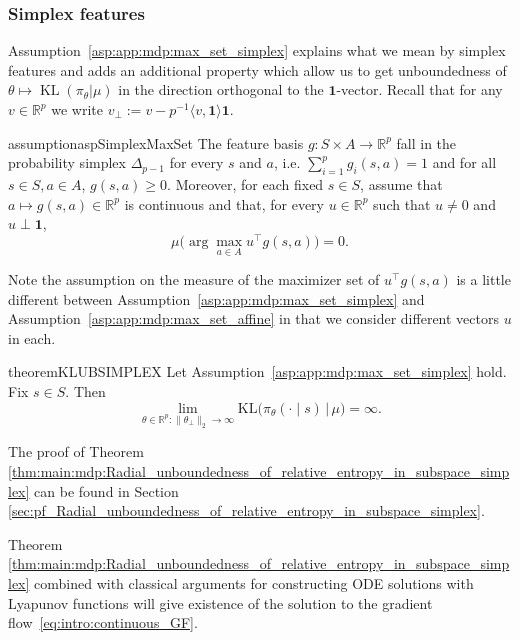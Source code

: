\documentclass{amsart}
\theoremstyle{definition}
\begin{document}
\subsubsection*{Simplex features}

Assumption~\ref{asp:app:mdp:max_set_simplex} explains what we mean by simplex features and adds an additional property which allow us to get unboundedness of $\theta \mapsto \operatorname{KL}(\pi_\theta|\mu)$ in the direction orthogonal to the $\mathbf 1$-vector.
Recall that for any $v\in \mathbb R^p$ we write $v_\perp := v - p^{-1}\langle v, \mathbf 1\rangle \mathbf 1$.

\begin{restatable}{assumption}{aspSimplexMaxSet}\label{asp:app:mdp:max_set_simplex}
The feature basis $g:S\times A \to \mathbb R^p$ fall in the probability simplex $\Delta_{p-1}$ for every $s$ and $a$, i.e. $\sum_{i=1}^p g_i(s,a) = 1 $ and for all $s \in S,a \in A$, $g(s,a) \geq 0$. 
Moreover, for each fixed
$s\in S$, assume that $a\mapsto g(s,a)\in\mathbb R^p$ is continuous
and that, for every $u\in\mathbb R^p$ such that $u\neq 0$ and $u \perp \mathbf{1}$,
\[
\mu \big(\arg\max_{a\in A} u^\top g(s,a)\big)=0 .
\]
\end{restatable}
Note the assumption on the measure of the maximizer set of $u^\top g(s,a)$ is a little different between Assumption~\ref{asp:app:mdp:max_set_simplex}
and Assumption~\ref{asp:app:mdp:max_set_affine} in that we consider different vectors $u$ in each.

\begin{restatable}{theorem}{KLUBSIMPLEX}\label{thm:main:mdp:Radial_unboundedness_of_relative_entropy_in_subspace_simplex}
Let Assumption~\ref{asp:app:mdp:max_set_simplex} hold.
Fix $s\in S$.
Then 
\[
\lim_{\theta\in \mathbb R^p:\|\theta_\perp\|_2\to\infty}
\mathrm{KL}\bigl(\pi_\theta(\cdot\mid s)\,|\,\mu\bigr)=\infty.
\]
\end{restatable}

The proof of Theorem \ref{thm:main:mdp:Radial_unboundedness_of_relative_entropy_in_subspace_simplex} can be found in Section \ref{sec:pf_Radial_unboundedness_of_relative_entropy_in_subspace_simplex}.

Theorem \ref{thm:main:mdp:Radial_unboundedness_of_relative_entropy_in_subspace_simplex} combined with classical arguments for constructing ODE solutions with Lyapunov functions will give existence of the solution to the gradient flow~\eqref{eq:intro:continuous_GF}.
\end{document}
